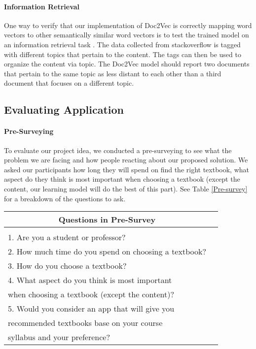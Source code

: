 \paragraph{Information Retrieval}

One way to verify that our implementation of Doc2Vec is correctly mapping word vectors to other semantically similar word vectors is to test the trained model on an information retrieval task . \cite{RefWorks:doc:5a6e5746e4b0d609eec798d7} The data collected from stackoverflow is tagged with different topics that pertain to the content. The tags can then be used to organize the content via topic. The Doc2Vec model should report two documents that pertain to the same topic as less distant to each other than a third document that focuses on a different topic.

%
\subsection{Evaluating Application}
\paragraph{Pre-Surveying}
To evaluate our project idea, we conducted a pre-surveying to see what the problem we are facing and how people reacting about our proposed solution. We asked our participants how long they will spend on find the right textbook, what aspect do they think is most important when choosing a textbook (except the content, our learning model will do the best of this part). See Table \ref{Pre-survey} for a breakdown of the questions to ask.

\begin{tabular}{ll}
\multicolumn{1}{c}{\bf Questions in Pre-Survey} 
\\ \hline \\
1. Are you a student or professor?\\
2. How much time do you spend on choosing a textbook?\\
3. How do you choose a textbook?\\
4. What aspect do you think is most important\\
when choosing a textbook (except the content)? \\
5. Would you consider an app that will give you \\
recommended textbooks base on your course \\
syllabus and your preference? \\
\end{tabular} \label{Pre-survey}


